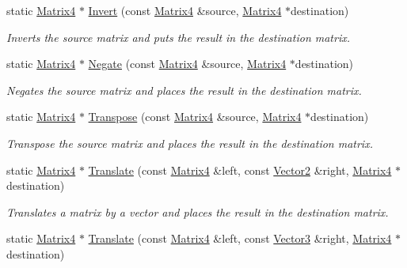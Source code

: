 \begin{DoxyCompactItemize}
static \hyperlink{class_flounder_1_1_matrix4}{Matrix4} $\ast$ \hyperlink{class_flounder_1_1_matrix4_ae48cb847531544dbbdcff48f8a244c66}{Invert} (const \hyperlink{class_flounder_1_1_matrix4}{Matrix4} \&source, \hyperlink{class_flounder_1_1_matrix4}{Matrix4} $\ast$destination)
\begin{DoxyCompactList}\small\item\em Inverts the source matrix and puts the result in the destination matrix. \end{DoxyCompactList}\item 
static \hyperlink{class_flounder_1_1_matrix4}{Matrix4} $\ast$ \hyperlink{class_flounder_1_1_matrix4_a459627fdaa438432cb33afa8e2392535}{Negate} (const \hyperlink{class_flounder_1_1_matrix4}{Matrix4} \&source, \hyperlink{class_flounder_1_1_matrix4}{Matrix4} $\ast$destination)
\begin{DoxyCompactList}\small\item\em Negates the source matrix and places the result in the destination matrix. \end{DoxyCompactList}\item 
static \hyperlink{class_flounder_1_1_matrix4}{Matrix4} $\ast$ \hyperlink{class_flounder_1_1_matrix4_a9ff487153cd72716d4623d86a538e77f}{Transpose} (const \hyperlink{class_flounder_1_1_matrix4}{Matrix4} \&source, \hyperlink{class_flounder_1_1_matrix4}{Matrix4} $\ast$destination)
\begin{DoxyCompactList}\small\item\em Transpose the source matrix and places the result in the destination matrix. \end{DoxyCompactList}\item 
static \hyperlink{class_flounder_1_1_matrix4}{Matrix4} $\ast$ \hyperlink{class_flounder_1_1_matrix4_a99892800187dc6c8408788e6d94a8739}{Translate} (const \hyperlink{class_flounder_1_1_matrix4}{Matrix4} \&left, const \hyperlink{class_flounder_1_1_vector2}{Vector2} \&right, \hyperlink{class_flounder_1_1_matrix4}{Matrix4} $\ast$destination)
\begin{DoxyCompactList}\small\item\em Translates a matrix by a vector and places the result in the destination matrix. \end{DoxyCompactList}\item 
static \hyperlink{class_flounder_1_1_matrix4}{Matrix4} $\ast$ \hyperlink{class_flounder_1_1_matrix4_a34d65b257e8f5473035d972c0e0cbc94}{Translate} (const \hyperlink{class_flounder_1_1_matrix4}{Matrix4} \&left, const \hyperlink{class_flounder_1_1_vector3}{Vector3} \&right, \hyperlink{class_flounder_1_1_matrix4}{Matrix4} $\ast$destination)

\end{DoxyCompactItemize}
